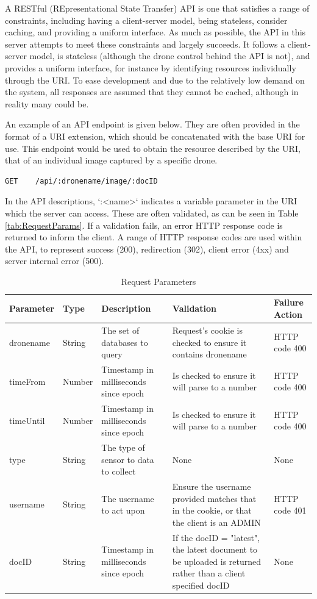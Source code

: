 \documentclass{article}
\begin{document}
A RESTful (REpresentational State Transfer) API is one that satisfies a range of constraints, including having a client-server model, being stateless, consider caching, and providing a uniform interface. As much as possible, the API in this server attempts to meet these constraints and largely succeeds. It follows a client-server model, is stateless (although the drone control behind the API is not), and provides a uniform interface, for instance by identifying resources individually through the URI. To ease development and due to the relatively low demand on the system, all responses are assumed that they cannot be cached, although in reality many could be. 

An example of an API endpoint is given below. They are often provided in the format of a URI extension, which should be concatenated with the base URI for use. This endpoint would be used to obtain the resource described by the URI, that of an individual image captured by a specific drone.
\begin{lstlisting}
GET    /api/:dronename/image/:docID
\end{lstlisting}
In the API descriptions, `:\textless name\textgreater` indicates a variable parameter in the URI which the server can access\cite{expressDocs}. These are often validated, as can be seen in Table \ref{tab:RequestParams}. If a validation fails, an error HTTP response code is returned to inform the client. A range of HTTP response codes are used within the API, to represent success (200), redirection (302), client error (4xx) and server internal error (500).

\begin{table}[h]
\caption{Request Parameters\label{tab:RequestParams}}
\centering
\renewcommand{\arraystretch}{1.5}
\begin{tabularx}{\textwidth}{>{\centering}p{1.5cm} >{\centering}p{1cm} >{\centering}p{3cm} X >{\centering}p{2cm}}
Parameter & Type & Description & Validation & Failure Action \tabularnewline [0.5ex]
\hline
dronename & String & The set of databases to query & Request's cookie is checked to ensure it contains dronename & HTTP code 400 \tabularnewline
timeFrom  & Number & Timestamp in milliseconds since epoch  & Is checked to ensure it will parse to a number & HTTP code 400 \tabularnewline
timeUntil & Number & Timestamp in milliseconds since epoch  & Is checked to ensure it will parse to a number & HTTP code 400 \tabularnewline
type      & String & The type of sensor to data to collect & None & None \tabularnewline
username  & String & The username to act upon & Ensure the username provided matches that in the cookie, or that the client is an ADMIN & HTTP code 401 \tabularnewline 
docID 	  & String & Timestamp in milliseconds since epoch & If the docID = "latest", the latest document to be uploaded is returned rather than a client specified docID & None \tabularnewline [1ex]
\hline
\end{tabularx}
\label{table:requestParams}
\end{table}
\end{document}
